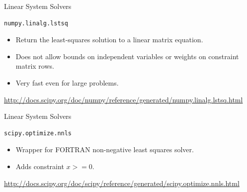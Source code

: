 \documentclass{beamer}
\begin{document}
\begin{frame}[fragile]{Linear System Solvers}

\begin{verbatim}
numpy.linalg.lstsq
\end{verbatim}

\begin{itemize}
\item Return the least-squares solution to a linear matrix equation.

\vspace{0.3cm}

\item Does not allow bounds on independent variables or weights on constraint matrix rows.

\vspace{0.3cm}

\item Very fast even for large problems.

\end{itemize}

\vspace{0.5cm}

\tiny{\url{http://docs.scipy.org/doc/numpy/reference/generated/numpy.linalg.lstsq.html}}

\end{frame}


\begin{frame}[fragile]{Linear System Solvers}

\begin{verbatim}
scipy.optimize.nnls
\end{verbatim}

\begin{itemize}
\item Wrapper for FORTRAN non-negative least squares solver.

\vspace{0.3cm}

\item Adds constraint \(x>=0\).

\end{itemize}

\vspace{0.5cm}

\tiny{\url{http://docs.scipy.org/doc/scipy/reference/generated/scipy.optimize.nnls.html}}

\end{frame}
\end{document}
